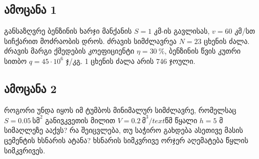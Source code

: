 \documentclass{article}
\begin{document}
\subsection{ამოცანა 1}
განსაზღვრე ბენზინის ხარჯი მანქანის $S = 1$ კმ-ის გავლისას, $v = 60$ კმ/სთ სიჩქარით მოძრაობის დროს. ძრავის სიმძლავრეა $N = 23$ ცხენის ძალა. ძრავის მარგი ქმედების კოეფიციენტი $\eta = 30 ~ \%$, ბენზინის წვის კუთრი სითბო $q = 45 \cdot 10^6$ ჯ/კგ. 1 ცხენის ძალა არის 746 ჯოული.

\subsection{ამოცანა 2}
როგორი უნდა იყოს იმ ტუმბოს მინიმალურ სიმძლავრე, რომელსაც $S = 0.05~\text{სმ}^2$ განივკვეთის მილით $V = 0.2 ~ \text{მ}^3/text{წმ}$ წყალი $h = 5$ მ სიმაღლეზე ააქვს? რა შეიცვლება, თუ საჭირო გახდება ასეთივე მასის ცემენტის ხსნარის ატანა? ხსნარის სიმკვრივე ორჯერ აღემატება წყლის სიმკვრივეს.
\end{document}

